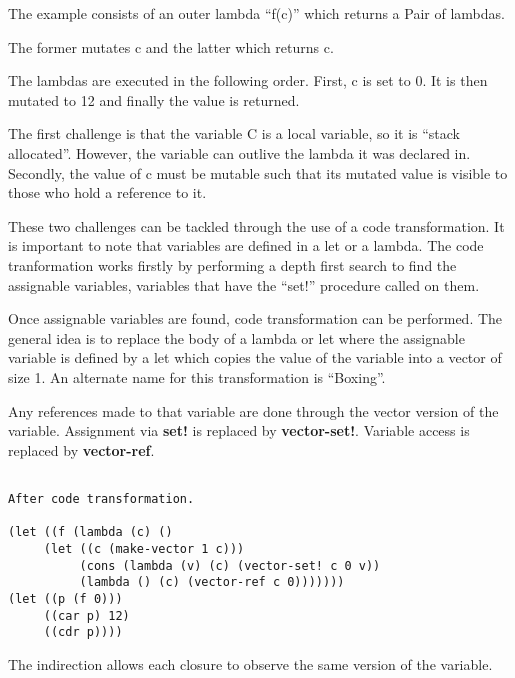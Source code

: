 \documentclass{article}
\begin{document}
The example consists of an outer lambda ``f(c)'' which returns a Pair of lambdas.

The former mutates c and the latter which returns c.

The lambdas are executed in the following order. First, c is set to 0. It is then mutated to 12 and finally the value is returned.

The first challenge is that the variable C is a local variable, so it is ``stack allocated''. However, the variable can outlive the lambda it was declared in. Secondly, the value of c must be mutable such that its mutated value is visible to those who hold a reference to it.

These two challenges can be tackled through the use of a code transformation. It is important to note that variables are defined in a let or a lambda. The code tranformation works firstly by performing a depth first search to find the assignable variables, variables that have the ``set!'' procedure called on them.

Once assignable variables are found, code transformation can be performed. The general idea is to replace the body of a lambda or let where the assignable variable is defined by a let which copies the value of the variable into a vector of size 1. An alternate name for this transformation is ``Boxing''.

Any references made to that variable are done through the vector version of the variable. Assignment via \textbf{set!} is replaced by \textbf{vector-set!}. Variable access is replaced by \textbf{vector-ref}.

\begin{verbatim}

After code transformation. 

(let ((f (lambda (c) ()
     (let ((c (make-vector 1 c)))
     	  (cons (lambda (v) (c) (vector-set! c 0 v))
	  	  (lambda () (c) (vector-ref c 0)))))))
(let ((p (f 0)))
     ((car p) 12)
     ((cdr p))))
\end{verbatim}

The indirection allows each closure to observe the same version of the variable. 
\end{document}
